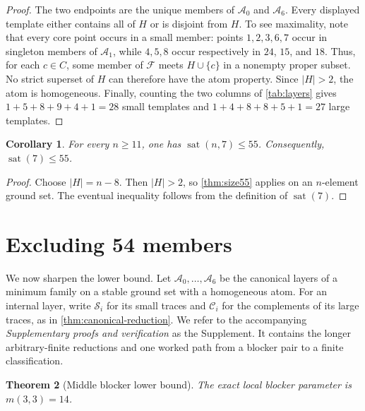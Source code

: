 \documentclass[11pt]{article}
\newtheorem{theorem}{Theorem}[section]
\newtheorem{corollary}[theorem]{Corollary}
\theoremstyle{definition}
\theoremstyle{remark}
\newcommand{\family}{\mathcal{F}}
\newcommand{\sat}{\operatorname{sat}}
\begin{document}
\begin{proof}
The two endpoints are the unique members of $\mathcal A_0$ and
$\mathcal A_6$.  Every displayed template either contains all of $H$ or is
disjoint from $H$.  To see maximality, note that every core point occurs in a
small member: points $1,2,3,6,7$ occur in singleton members of
$\mathcal A_1$, while $4,5,8$ occur respectively in $24$, $15$, and $18$.
Thus, for each $c\in C$, some member of $\family$ meets $H\cup\{c\}$ in a
nonempty proper subset.  No strict superset of $H$ can therefore have the
atom property.  Since $|H|>2$, the atom is homogeneous.  Finally, counting
the two columns of \cref{tab:layers} gives
$1+5+8+9+4+1=28$ small templates and
$1+4+8+8+5+1=27$ large templates.
\end{proof}

\par\medskip

\begin{corollary}
\label{cor:main-bound}
For every $n\geq11$, one has $\sat(n,7)\leq55$.  Consequently,
$\sat(7)\leq55$.
\end{corollary}

\begin{proof}
Choose $|H|=n-8$.  Then $|H|>2$, so \cref{thm:size55} applies on an
$n$-element ground set.  The eventual inequality follows from the definition
of $\sat(7)$.
\end{proof}

\section{Excluding 54 members}
\label{sec:exact-seven}

We now sharpen the lower bound.  Let
$\mathcal A_0,\ldots,\mathcal A_6$ be the canonical layers of a minimum
family on a stable ground set with a homogeneous atom.  For an internal layer,
write $\mathcal S_i$ for its small traces and $\mathcal C_i$ for the
complements of its large traces, as in \cref{thm:canonical-reduction}.
We refer to the accompanying \emph{Supplementary proofs and verification}
as the Supplement.  It contains the longer arbitrary-finite reductions and
one worked path from a blocker pair to a finite classification.

\begin{theorem}[Middle blocker lower bound]
\label{thm:m33}
The exact local blocker parameter is $m(3,3)=14$.
\end{theorem}
\end{document}
